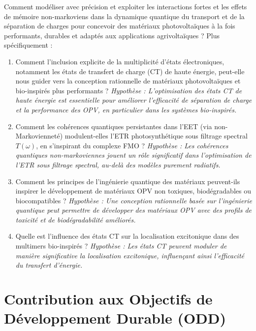 \documentclass[12pt, a4paper]{article}
\begin{document}
Comment modéliser avec précision et exploiter les interactions fortes et les effets de mémoire non-markoviens dans la dynamique quantique du transport et de la séparation de charges pour concevoir des matériaux photovoltaïques à la fois performants, durables et adaptés aux applications agrivoltaïques ? Plus spécifiquement :
\begin{enumerate}
\item Comment l'inclusion explicite de la multiplicité d'états électroniques, notamment les états de transfert de charge (CT) de haute énergie, peut-elle nous guider vers la conception rationnelle de matériaux photovoltaïques et bio-inspirés plus performants ? \newline \textit{Hypothèse : L'optimisation des états CT de haute énergie est essentielle pour améliorer l'efficacité de séparation de charge et la performance des OPV, en particulier dans les systèmes bio-inspirés.}

\item Comment les cohérences quantiques persistantes dans l'EET (via non-Markovienneté) modulent-elles l'ETR photosynthétique sous filtrage spectral $T(\omega)$, en s'inspirant du complexe FMO ? \newline \textit{Hypothèse : Les cohérences quantiques non-markoviennes jouent un rôle significatif dans l'optimisation de l'ETR sous filtrage spectral, au-delà des modèles purement radiatifs.}

\item Comment les principes de l'ingénierie quantique des matériaux peuvent-ils inspirer le développement de matériaux OPV non toxiques, biodégradables ou biocompatibles ? \newline \textit{Hypothèse : Une conception rationnelle basée sur l'ingénierie quantique peut permettre de développer des matériaux OPV avec des profils de toxicité et de biodégradabilité améliorés.}

\item Quelle est l'influence des états CT sur la localisation excitonique dans des multimers bio-inspirés ? \newline \textit{Hypothèse : Les états CT peuvent moduler de manière significative la localisation excitonique, influençant ainsi l'efficacité du transfert d'énergie.}
\end{enumerate}

\section{Contribution aux Objectifs de Développement Durable (ODD)}
\end{document}
